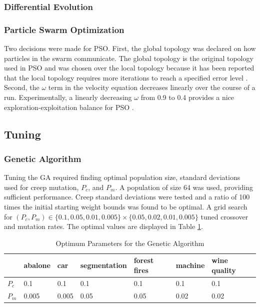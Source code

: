 \documentclass[twoside,11pt]{article}
\begin{document}
\subsubsection{Differential Evolution}

\subsubsection{Particle Swarm Optimization}

	
	Two decisions were made for PSO. First, the global topology was declared on how particles in the swarm communicate. 
	The global topology is the original topology used in PSO and was chosen over the local topology because it has been reported that the local topology requires more iterations to reach a specified error level \citep{og-pso}. 
	Second, the $\omega$ term in the velocity equation decreases linearly over the course of a run. Experimentally, a linearly decreasing $\omega$ from 0.9 to 0.4 provides a nice exploration-exploitation balance for PSO \citep{inertia}.

\subsection{Tuning}

\subsubsection{Genetic Algorithm}

	Tuning the GA required finding optimal population size, standard deviations used for creep mutation, $P_c$, and $P_m$. A population of size 64 was used, providing sufficient performance. Creep standard deviations were tested and a ratio of 100 times the initial starting weight bounds was found to be optimal. A grid search for $(P_c, P_m) \in \{0.1, 0.05, 0.01, 0.005\} \times \{0.05, 0.02, 0.01, 0.005\}$ tuned crossover and mutation rates. The optimal values are displayed in Table \ref{ga-tuning-table}. 

	\begin{table}[h]
		\centering
		\begin{tabular}{|l|l|l|l|l|l|l|}
			\hline
			       & abalone & car & segmentation & forest fires & machine & wine quality  \\ \hline
			$P_c$  &     0.1 & 0.1 &          0.1 &          0.1 &     0.1 &          0.1  \\ \hline
			$P_m$  &   0.005 & 0.005 &       0.05 &         0.05 &    0.02 &         0.02  \\ \hline
		\end{tabular}
		\caption{Optimum Parameters for the Genetic Algorithm}
		\label{ga-tuning-table}
	\end{table}
\end{document}
